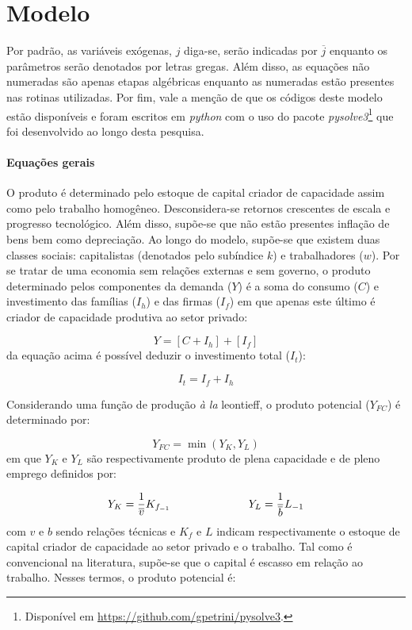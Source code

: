 \section{Modelo}
\label{SecModelo}

Por padrão, as variáveis exógenas, $j$ diga-se, serão indicadas por $\overline{j}$ enquanto os parâmetros serão denotados por letras gregas. Além disso, as equações não numeradas são apenas etapas algébricas enquanto as numeradas estão presentes nas rotinas utilizadas. Por fim, vale a menção de que os códigos deste modelo estão disponíveis e foram escritos em \textit{python} com o uso do pacote \textit{pysolve3}\footnote{
	Disponível em \url{https://github.com/gpetrini/pysolve3}.
} que foi desenvolvido ao longo desta pesquisa.

\paragraph*{Equações gerais}

O produto é determinado pelo estoque de capital criador de capacidade assim como pelo trabalho homogêneo. Desconsidera-se retornos crescentes de escala e progresso tecnológico.
Além disso, supõe-se que não estão presentes inflação de bens bem como depreciação.  
Ao longo do modelo, supõe-se que existem duas classes sociais: capitalistas (denotados pelo subíndice $k$) e trabalhadores ($w$).
Por se tratar de uma economia sem relações externas e sem governo, o produto determinado pelos componentes da demanda ($Y$) é a soma do consumo ($C$) e investimento das famílias ($I_h$) e das firmas ($I_f$) em que apenas este último é criador de capacidade produtiva ao setor privado:

\begin{equation}
\label{_Y}
    Y = [C + I_h] + [I_f]
\end{equation}
da equação acima é possível deduzir o investimento total ($I_t$):

\begin{equation}
\label{_It}
    I_t = I_f + I_h
\end{equation}

Considerando uma função de produção \textit{à la} leontieff, o produto potencial ($Y_{FC}$) é determinado por:

$$
Y_{FC} = \min (Y_K, Y_L)
$$
em que $Y_K$ e $Y_L$ são respectivamente produto de plena capacidade e de pleno emprego definidos por:

$$
Y_K = \frac{1}{\overline v}K_{f_{-1}} \hspace{2.5cm} Y_L = \frac{1}{\overline b}L_{-1}
$$
com $v$ e $b$ sendo relações técnicas e $K_f$ e $L$ indicam respectivamente o estoque de capital criador de capacidade ao setor privado e  o trabalho. Tal como é convencional na literatura, supõe-se que o capital é escasso em relação ao trabalho. Nesses termos, o produto potencial é:

